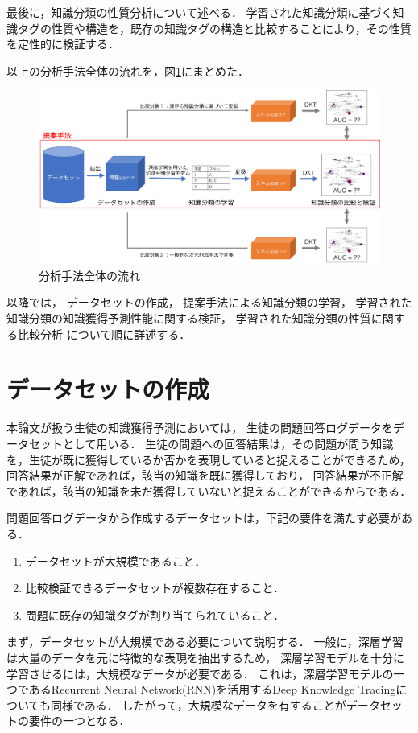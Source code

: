 最後に，知識分類の性質分析について述べる．
学習された知識分類に基づく知識タグの性質や構造を，既存の知識タグの構造と比較することにより，その性質を定性的に検証する．


以上の分析手法全体の流れを，図\ref{fig:workflow}にまとめた．
\begin{figure}[htb]
\begin{center}
\includegraphics[width=400pt]{./img/workflow.png}
\end{center}
\caption{分析手法全体の流れ}
\label{fig:workflow}
\end{figure}

以降では，
データセットの作成，
提案手法による知識分類の学習，
学習された知識分類の知識獲得予測性能に関する検証，
学習された知識分類の性質に関する比較分析
について順に詳述する．


\section{データセットの作成}
本論文が扱う生徒の知識獲得予測においては，
生徒の問題回答ログデータをデータセットとして用いる．
生徒の問題への回答結果は，その問題が問う知識を，生徒が既に獲得しているか否かを表現していると捉えることができるため，
回答結果が正解であれば，該当の知識を既に獲得しており，
回答結果が不正解であれば，該当の知識を未だ獲得していないと捉えることができるからである．

問題回答ログデータから作成するデータセットは，下記の要件を満たす必要がある．
\begin{enumerate}
	\item データセットが大規模であること．
	\item 比較検証できるデータセットが複数存在すること．
	\item 問題に既存の知識タグが割り当てられていること．
\end{enumerate}


まず，データセットが大規模である必要について説明する．
一般に，深層学習は大量のデータを元に特徴的な表現を抽出するため，
深層学習モデルを十分に学習させるには，大規模なデータが必要である．
これは，深層学習モデルの一つであるRecurrent Neural Network(RNN)を活用するDeep Knowledge Tracingについても同様である\cite{piech2015deep}．
したがって，大規模なデータを有することがデータセットの要件の一つとなる．

